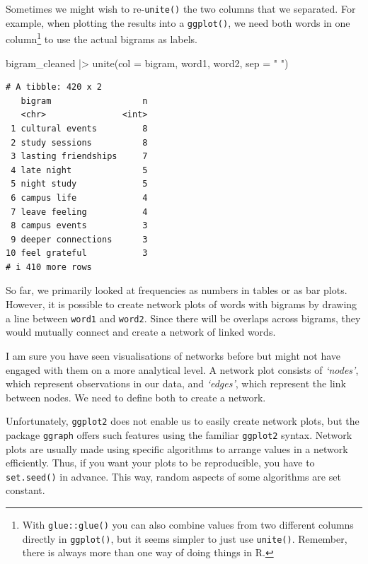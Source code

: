 \documentclass[
  letterpaper,
  DIV=11,
  numbers=noendperiod]{scrreprt}
\newenvironment{Shaded}{\begin{snugshade}}{\end{snugshade}}
\newcommand{\AttributeTok}[1]{\textcolor[rgb]{0.40,0.45,0.13}{#1}}
\newcommand{\FunctionTok}[1]{\textcolor[rgb]{0.28,0.35,0.67}{#1}}
\newcommand{\NormalTok}[1]{\textcolor[rgb]{0.00,0.23,0.31}{#1}}
\newcommand{\SpecialCharTok}[1]{\textcolor[rgb]{0.37,0.37,0.37}{#1}}
\newcommand{\StringTok}[1]{\textcolor[rgb]{0.13,0.47,0.30}{#1}}
\begin{document}
Sometimes we might wish to re-\texttt{unite()} the two columns that we
separated. For example, when plotting the results into a
\texttt{ggplot()}, we need both words in one column\footnote{With
  \texttt{glue::glue()} you can also combine values from two different
  columns directly in \texttt{ggplot()}, but it seems simpler to just
  use \texttt{unite()}. Remember, there is always more than one way of
  doing things in R.} to use the actual bigrams as labels.

\begin{Shaded}
\begin{Highlighting}[]
\NormalTok{bigram\_cleaned }\SpecialCharTok{|\textgreater{}}
  \FunctionTok{unite}\NormalTok{(}\AttributeTok{col =}\NormalTok{ bigram,}
\NormalTok{        word1, word2,}
        \AttributeTok{sep =} \StringTok{" "}\NormalTok{)}
\end{Highlighting}
\end{Shaded}

\begin{verbatim}
# A tibble: 420 x 2
   bigram                  n
   <chr>               <int>
 1 cultural events         8
 2 study sessions          8
 3 lasting friendships     7
 4 late night              5
 5 night study             5
 6 campus life             4
 7 leave feeling           4
 8 campus events           3
 9 deeper connections      3
10 feel grateful           3
# i 410 more rows
\end{verbatim}

So far, we primarily looked at frequencies as numbers in tables or as
bar plots. However, it is possible to create network plots of words with
bigrams by drawing a line between \texttt{word1} and \texttt{word2}.
Since there will be overlaps across bigrams, they would mutually connect
and create a network of linked words.

I am sure you have seen visualisations of networks before but might not
have engaged with them on a more analytical level. A network plot
consists of \emph{`nodes'}, which represent observations in our data,
and \emph{`edges'}, which represent the link between nodes. We need to
define both to create a network.

Unfortunately, \texttt{ggplot2} does not enable us to easily create
network plots, but the package \texttt{ggraph} offers such features
using the familiar \texttt{ggplot2} syntax. Network plots are usually
made using specific algorithms to arrange values in a network
efficiently. Thus, if you want your plots to be reproducible, you have
to \texttt{set.seed()} in advance. This way, random aspects of some
algorithms are set constant.
\end{document}
